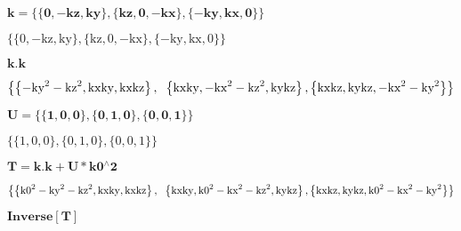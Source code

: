 \documentclass{article}
\begin{document}
\noindent\(\pmb{k=\{\{0,-\text{kz},\text{ky}\},\{\text{kz},0,-\text{kx}\},\{-\text{ky},\text{kx},0\}\}}\)

\noindent\(\{\{0,-\text{kz},\text{ky}\},\{\text{kz},0,-\text{kx}\},\{-\text{ky},\text{kx},0\}\}\)

\noindent\(\pmb{k.k}\)

\noindent\(\left\{\left\{-\text{ky}^2-\text{kz}^2,\text{kx} \text{ky},\text{kx} \text{kz}\right\},\right.\\
\left.\left\{\text{kx} \text{ky},-\text{kx}^2-\text{kz}^2,\text{ky} \text{kz}\right\},\left\{\text{kx} \text{kz},\text{ky} \text{kz},-\text{kx}^2-\text{ky}^2\right\}\right\}\)

\noindent\(\pmb{U=\{\{1,0,0\},\{0,1,0\},\{0,0,1\}\}}\)

\noindent\(\{\{1,0,0\},\{0,1,0\},\{0,0,1\}\}\)

\noindent\(\pmb{T=k.k+U*\text{k0}{}^{\wedge}2}\)

\noindent\(\left\{\left\{\text{k0}^2-\text{ky}^2-\text{kz}^2,\text{kx} \text{ky},\text{kx} \text{kz}\right\},\right.\\
\left.\left\{\text{kx} \text{ky},\text{k0}^2-\text{kx}^2-\text{kz}^2,\text{ky} \text{kz}\right\},\left\{\text{kx} \text{kz},\text{ky} \text{kz},\text{k0}^2-\text{kx}^2-\text{ky}^2\right\}\right\}\)

\noindent\(\pmb{\text{Inverse}[T]}\)
\end{document}
